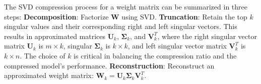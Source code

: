 The SVD compression process for a weight matrix can be summarized in three steps: \textbf{Decomposition}: Factorize $\mathbf{W}$ using SVD. \textbf{Truncation}: Retain the top $k$ singular values and their corresponding right and left singular vectors. This results in approximated matrices $\mathbf{U}_k$, $\mathbf{\Sigma}_k$, and $\mathbf{V}_k^T$, where the right singular vector matrix $\mathbf{U}_k$ is $m \times k$, singular $\mathbf{\Sigma}_k$ is $k \times k$, and left singular vector matrix $\mathbf{V}_k^T$ is $k \times n$. The choice of $k$ is critical in balancing the compression ratio and the compressed model's performance. \textbf{Reconstruction}: Reconstruct an approximated weight matrix:
$\mathbf{W}_k = \mathbf{U}_k \mathbf{\Sigma}_k \mathbf{V}_k^T$.


